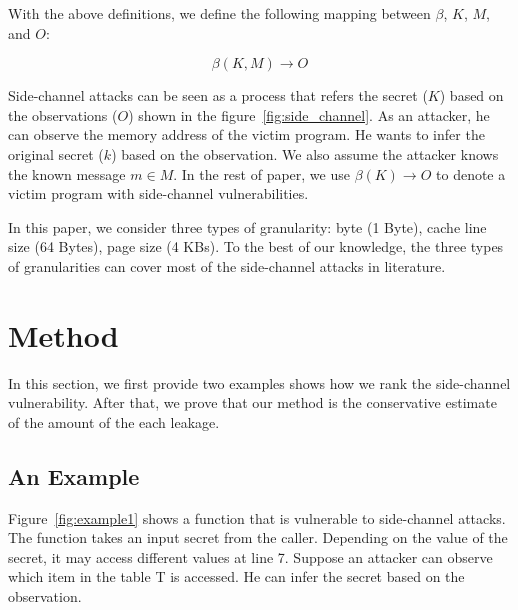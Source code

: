 With the above definitions, we define the following mapping between $\beta$,
$K$, $M$, and $O$:

\begin{displaymath}
  \beta(K, M) \rightarrow O
\end{displaymath}


Side-channel attacks can be seen as a process that refers the secret ($K$) based on the observations ($O$) shown in the figure~\ref{fig:side_channel}. As an attacker, he can observe the memory address of the victim program. He wants to infer the original secret ($k$) based on the observation. We also assume the attacker knows the known message $m \in M$. In the rest of paper, we use $\beta(K) \rightarrow O$ to denote a victim program with side-channel vulnerabilities.


In this paper, we consider three types of granularity: byte (1 Byte), cache line size (64 Bytes), page size (4 KBs). To the best of our knowledge, the three types of granularities can cover most of the side-channel attacks in literature.

\section{Method}
In this section, we first provide two examples shows how we rank the side-channel vulnerability. After that, we prove that our method is the conservative estimate of the amount of the each leakage.

\subsection{An Example}
Figure~\ref{fig:example1} shows a function that is vulnerable to side-channel attacks. The function takes an input secret from the caller. Depending on the value of the secret, it may access different values at line 7. Suppose an attacker can observe which item in the table \textsf{T} is accessed. He can infer the secret based on the observation.

